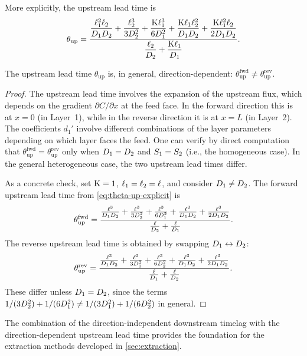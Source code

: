 More explicitly, the upstream lead time is
\begin{equation}
  \label{eq:theta-up-explicit}
  \theta_{\mathrm{up}} = \frac{
    \dfrac{\ell_{1}^2\ell_{2}}{D_{1}D_{2}}
    + \dfrac{\ell_{2}^3}{3D_{2}^2}
    + \dfrac{\mathrm{K}\ell_{1}^3}{6D_{1}^2}
    + \dfrac{\mathrm{K}\ell_{1}\ell_{2}^2}{D_{1}D_{2}}
    + \dfrac{\mathrm{K}\ell_{1}^2\ell_{2}}{2D_{1}D_{2}}
  }{\dfrac{\ell_{2}}{D_{2}} + \dfrac{\mathrm{K}\ell_{1}}{D_{1}}}.
\end{equation}

\begin{proposition}
\label{prop:upstream-direction}
The upstream lead time $\theta_{\mathrm{up}}$ is, in general,
direction-dependent:
$\theta_{\mathrm{up}}^{\mathrm{fwd}} \neq \theta_{\mathrm{up}}^{\mathrm{rev}}$.
\end{proposition}

\begin{proof}
The upstream lead time involves the expansion of the upstream flux, which
depends on the gradient $\partial C/\partial x$ at the feed face.  In the
forward direction this is at $x=0$ (in Layer~1), while in the reverse direction
it is at $x=L$ (in Layer~2).  The coefficients $d_1'$ involve different
combinations of the layer parameters depending on which layer faces the feed.
One can verify by direct computation that
$\theta_{\mathrm{up}}^{\mathrm{fwd}} = \theta_{\mathrm{up}}^{\mathrm{rev}}$
only when $D_{1} = D_{2}$ and $S_{1} = S_{2}$ (i.e., the homogeneous
case).  In the general heterogeneous case, the two upstream lead times differ.

As a concrete check, set $\mathrm{K} = 1$, $\ell_{1} = \ell_{2} = \ell$, and
consider $D_{1} \neq D_{2}$.  The forward upstream lead time from
\cref{eq:theta-up-explicit} is
\begin{equation}
  \theta_{\mathrm{up}}^{\mathrm{fwd}}
  = \frac{\frac{\ell^3}{D_{1}D_{2}} + \frac{\ell^3}{3D_{2}^2}
    + \frac{\ell^3}{6D_{1}^2} + \frac{\ell^3}{D_{1}D_{2}}
    + \frac{\ell^3}{2D_{1}D_{2}}}
  {\frac{\ell}{D_{2}} + \frac{\ell}{D_{1}}}.
\end{equation}
The reverse upstream lead time is obtained by swapping $D_{1} \leftrightarrow
D_{2}$:
\begin{equation}
  \theta_{\mathrm{up}}^{\mathrm{rev}}
  = \frac{\frac{\ell^3}{D_{1}D_{2}} + \frac{\ell^3}{3D_{1}^2}
    + \frac{\ell^3}{6D_{2}^2} + \frac{\ell^3}{D_{1}D_{2}}
    + \frac{\ell^3}{2D_{1}D_{2}}}
  {\frac{\ell}{D_{1}} + \frac{\ell}{D_{2}}}.
\end{equation}
These differ unless $D_{1} = D_{2}$, since the terms $1/(3D_{2}^2) +
1/(6D_{1}^2) \neq 1/(3D_{1}^2) + 1/(6D_{2}^2)$ in general.
\end{proof}

\begin{remark}
The combination of the direction-independent downstream timelag with the
direction-dependent upstream lead time provides the foundation for the
extraction methods developed in \cref{sec:extraction}.
\end{remark}
